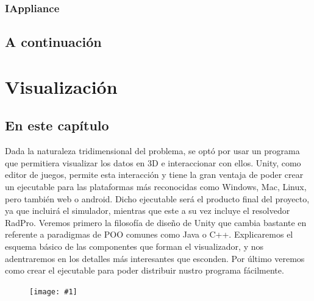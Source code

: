 \documentclass[12pt,a4paper,openright,oneside]{article}
\newcommand{\includeImage}[1]
{
	\begin{figure}[htb]
	\begin{center}
	\texttt{[image: \#1]}
	\end{center}
	\end{figure}
}
\numberwithin{equation}{section}
\theoremstyle{definition}
\begin{document}
\subsubsection{IAppliance}



\subsection{A continuación}
\newpage




\section{Visualización}

\subsection{En este capítulo}
Dada la naturaleza tridimensional del problema, se optó por usar un programa que permitiera visualizar los datos en 3D e interaccionar con ellos. Unity, como editor de juegos, permite esta interacción y tiene la gran ventaja de poder crear un ejecutable para las plataformas más reconocidas como Windows, Mac, Linux, pero también web o android. Dicho ejecutable será el producto final del proyecto, ya que incluirá el simulador, mientras que este a su vez incluye el resolvedor RadPro. Veremos primero la filosofía de diseño de Unity que cambia bastante en referente a paradigmas de POO comunes como Java o C++. Explicaremos el esquema básico de las componentes que forman el visualizador, y nos adentraremos en los detalles más interesantes que esconden. Por último veremos como crear el ejecutable para poder distribuir nustro programa fácilmente.
\includeImage{visualization.png}
\end{document}
